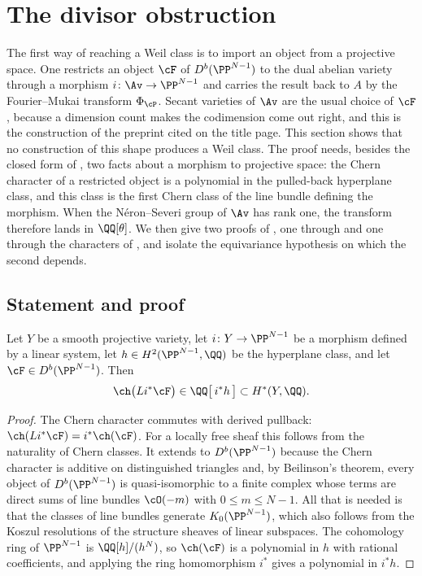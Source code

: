 \section{The divisor obstruction}\label{sec:divisor}

The first way of reaching a Weil class is to import an object from a
projective space. One restricts an object $\cF$ of $D^{b}(\PP^{N-1})$ to the
dual abelian variety through a morphism $i\colon\Av\to\PP^{N-1}$ and carries
the result back to $A$ by the Fourier--Mukai transform $\Phi_{\cP}$. Secant
varieties of $\Av$ are the usual choice of $\cF$, because a dimension count
makes the codimension come out right, and this is the construction of the
preprint cited on the title page. This section shows that no construction of
this shape produces a Weil class. The proof needs, besides the closed form of
, two facts about a morphism to projective space: the Chern
character of a restricted object is a polynomial in the pulled-back
hyperplane class, and this class is the first Chern class of the line bundle
defining the morphism. When the N\'eron--Severi group of $\Av$ has rank one,
the transform therefore lands in $\QQ[\theta]$. We then give two proofs of
, one through  and one through the
characters of , and isolate the equivariance hypothesis
on which the second depends.

\subsection{Statement and proof}

\begin{lemma}\label{lem:ambient}
Let $Y$ be a smooth projective variety, let $i\colon Y\to\PP^{N-1}$ be a
morphism defined by a linear system, let $h\in H^{2}(\PP^{N-1},\QQ)$ be the
hyperplane class, and let $\cF\in D^{b}(\PP^{N-1})$. Then
\[
  \ch\bigl(Li^{*}\cF\bigr)\in\QQ\bigl[\,i^{*}h\,\bigr]\subset H^{*}(Y,\QQ).
\]
\end{lemma}

\begin{proof}
The Chern character commutes with derived pullback:
$\ch(Li^{*}\cF)=i^{*}\ch(\cF)$. For a locally free sheaf this follows from
the naturality of Chern classes. It extends to $D^{b}(\PP^{N-1})$ because the
Chern character is additive on distinguished triangles and, by Beilinson's
theorem, every object of $D^{b}(\PP^{N-1})$ is quasi-isomorphic to a finite
complex whose terms are direct sums of line bundles $\cO(-m)$ with
$0\le m\le N-1$. All that is needed is that the classes of line bundles
generate $K_{0}(\PP^{N-1})$, which also follows from the Koszul resolutions
of the structure sheaves of linear subspaces. The cohomology ring of
$\PP^{N-1}$ is $\QQ[h]/(h^{N})$, so $\ch(\cF)$ is a polynomial in $h$ with
rational coefficients, and applying the ring homomorphism $i^{*}$ gives a
polynomial in $i^{*}h$.
\end{proof}

